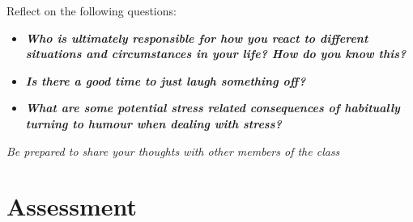 \documentclass[
]{book}
\providecommand{\tightlist}{%
  \setlength{\itemsep}{0pt}\setlength{\parskip}{0pt}}
\begin{document}
\begin{reflect}
Reflect on the following questions:

\begin{itemize}
\tightlist
\item
  \textbf{\emph{Who is ultimately responsible for how you react to different situations and circumstances in your life? How do you know this?}}
\item
  \textbf{\emph{Is there a good time to just laugh something off?}}\\
\item
  \textbf{\emph{What are some potential stress related consequences of habitually turning to humour when dealing with stress?}}
\end{itemize}

\emph{Be prepared to share your thoughts with other members of the class}
\end{reflect}

\hypertarget{assessment-8}{%
\section*{Assessment}\label{assessment-8}}
\end{document}
